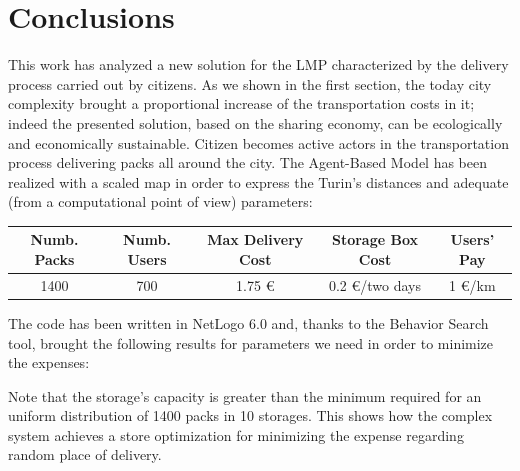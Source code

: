 \documentclass[11pt,a4paper]{article}
\begin{document}
\section{Conclusions}
This work has analyzed a new solution for the LMP characterized by the delivery process carried out by citizens. As we shown in the first section, the today city complexity brought a proportional increase of the transportation costs in it; indeed the presented solution, based on the sharing economy, can be ecologically and economically sustainable. Citizen becomes active actors in the transportation process delivering packs all around the city. The Agent-Based Model has been realized with a scaled map in order to express the Turin's distances and adequate (from a computational point of view) parameters: 
\begin{center}
\begin{tabular}{c|c|c|c|c}
 \hline 
 Numb. Packs & Numb. Users & Max Delivery Cost & Storage Box Cost & Users' Pay \\ 
 \hline 
 \hline
 1400 & 700 & 1.75 \euro{} & 0.2 \euro{}/two days & 1 \euro{}/km \\ 
 \hline 
\end{tabular} 
\end{center} 
The code has been written in NetLogo 6.0 and, thanks to the Behavior Search tool, brought the following results for parameters we need in order to minimize the expenses: 
\begin{center}
 \end{center}
Note that the storage's capacity is greater than the minimum required for an uniform distribution of 1400 packs in 10 storages. This shows how the complex system achieves a store optimization for minimizing the expense regarding random place of delivery.
\bigskip
\end{document}
